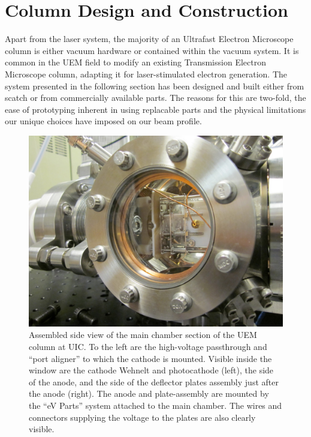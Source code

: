 
\section{Column Design and Construction}

Apart from the laser system, the majority of an Ultrafast Electron Microscope column is either vacuum hardware or contained within the vacuum system.
It is common in the UEM field to modify an existing Transmission Electron Microscope column, adapting it for laser-stimulated electron generation.
The system presented in the following section has been designed and built either from scatch or from commercially available parts.
The reasons for this are two-fold, the ease of prototyping inherent in using replacable parts and the physical limitations our unique choices have imposed on our beam profile.

\begin{figure}
  \centering
  \includegraphics{chamber.jpg}
  \caption[Side view of main chamber]{
    Assembled side view of the main chamber section of the UEM column at UIC.
    To the left are the high-voltage passthrough and ``port aligner'' to which the cathode is mounted.
    Visible inside the window are the cathode Wehnelt and photocathode (left), the side of the anode, and the side of the deflector plates assembly just after the anode (right).
    The anode and plate-assembly are mounted by the ``eV Parts'' system attached to the main chamber.
    The wires and connectors supplying the voltage to the plates are also clearly visible.
  }
  \label{fig:chamber-pic}
\end{figure}

